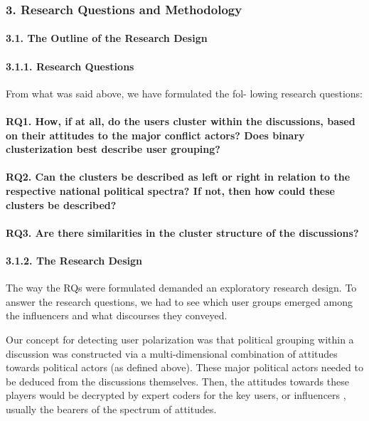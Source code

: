 \subsubsection{3. Research Questions and Methodology}

\paragraph{3.1. The Outline of the Research Design}

\paragraph{3.1.1. Research Questions} From what was said above, we have formulated the fol- lowing research questions:

\paragraph{RQ1. How, if at all, do the users cluster within the discussions, based on their attitudes to the major conflict actors? Does binary clusterization best describe user grouping?}

\paragraph{RQ2. Can the clusters be described as left or right in relation to the respective national political spectra? If not, then how could these clusters be described?}

\paragraph{RQ3. Are there similarities in the cluster structure of the discussions?}

\paragraph{3.1.2. The Research Design}

The way the RQs were formulated demanded an exploratory research design. To answer the research questions, we had to see which user groups emerged among the influencers and what discourses they conveyed.

Our concept for detecting user polarization was that political grouping within a discussion was constructed via a multi-dimensional combination of attitudes towards political actors (as defined above). These major political actors needed to be deduced from the discussions themselves. Then, the attitudes towards these players would be decrypted by expert coders for the key users, or influencers \cite{BodrunovaBlekanovMaksimov}, usually the bearers of the spectrum of attitudes.


